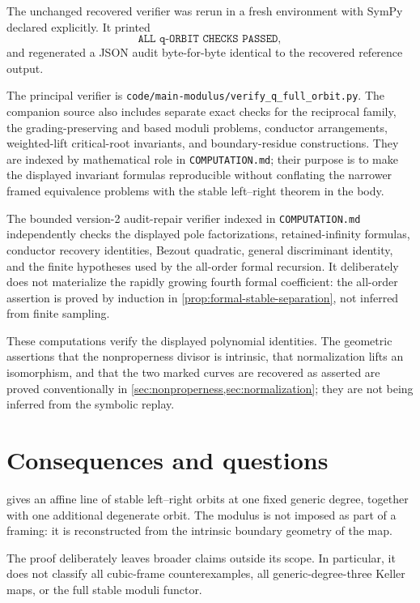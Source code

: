 \documentclass[11pt,reqno]{amsart}
\begin{document}
The unchanged recovered verifier was rerun in a fresh environment with SymPy
declared explicitly.  It printed
\[
\texttt{ALL q-ORBIT CHECKS PASSED},
\]
and regenerated a JSON audit byte-for-byte identical to the recovered
reference output.

The principal verifier is
\texttt{code/main-modulus/verify\_q\_full\_orbit.py}.  The companion source
also includes separate exact checks for the reciprocal family, the
grading-preserving and based moduli problems, conductor arrangements,
weighted-lift critical-root invariants, and boundary-residue constructions.
They are indexed by mathematical role in \texttt{COMPUTATION.md}; their
purpose is to make the displayed invariant formulas reproducible without
conflating the narrower framed equivalence problems with the stable
left--right theorem in the body.

The bounded version-2 audit-repair verifier indexed in
\texttt{COMPUTATION.md}
independently checks the displayed pole factorizations, retained-infinity
formulas, conductor recovery identities, Bezout quadratic, general
discriminant identity, and the finite hypotheses used by the all-order
formal recursion.  It deliberately does not materialize the rapidly growing
fourth formal coefficient: the all-order assertion is proved by induction in
\cref{prop:formal-stable-separation}, not inferred from finite sampling.

These computations verify the displayed polynomial identities.  The
geometric assertions that the nonproperness divisor is intrinsic, that
normalization lifts an isomorphism, and that the two marked curves are
recovered as asserted are proved conventionally in
\cref{sec:nonproperness,sec:normalization}; they are not being inferred from
the symbolic replay.

\section{Consequences and questions}
\label{sec:questions}

 gives an affine line of stable left--right orbits at one fixed
generic degree, together with one additional degenerate orbit.  The modulus
is not imposed as part of a framing: it is reconstructed from the intrinsic
boundary geometry of the map.

The proof deliberately leaves broader claims outside its scope.  In
particular, it does not classify all cubic-frame counterexamples, all
generic-degree-three Keller maps, or the full stable moduli functor.
\end{document}

